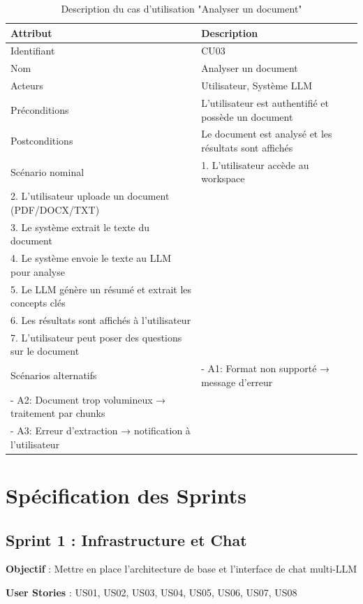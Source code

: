 \begin{table}[H]
\centering
\caption{Description du cas d'utilisation "Analyser un document"}
\label{tab:cu-analyse}
\begin{tabular}{|l|p{10cm}|}
\hline
\textbf{Attribut} & \textbf{Description} \\
\hline
Identifiant & CU03 \\
\hline
Nom & Analyser un document \\
\hline
Acteurs & Utilisateur, Système LLM \\
\hline
Préconditions & L'utilisateur est authentifié et possède un document \\
\hline
Postconditions & Le document est analysé et les résultats sont affichés \\
\hline
Scénario nominal & 
1. L'utilisateur accède au workspace\\
2. L'utilisateur uploade un document (PDF/DOCX/TXT)\\
3. Le système extrait le texte du document\\
4. Le système envoie le texte au LLM pour analyse\\
5. Le LLM génère un résumé et extrait les concepts clés\\
6. Les résultats sont affichés à l'utilisateur\\
7. L'utilisateur peut poser des questions sur le document \\
\hline
Scénarios alternatifs & 
- A1: Format non supporté → message d'erreur\\
- A2: Document trop volumineux → traitement par chunks\\
- A3: Erreur d'extraction → notification à l'utilisateur \\
\hline
\end{tabular}
\end{table}

\section{Spécification des Sprints}

\subsection{Sprint 1 : Infrastructure et Chat}

\textbf{Objectif} : Mettre en place l'architecture de base et l'interface de chat multi-LLM

\textbf{User Stories} : US01, US02, US03, US04, US05, US06, US07, US08

